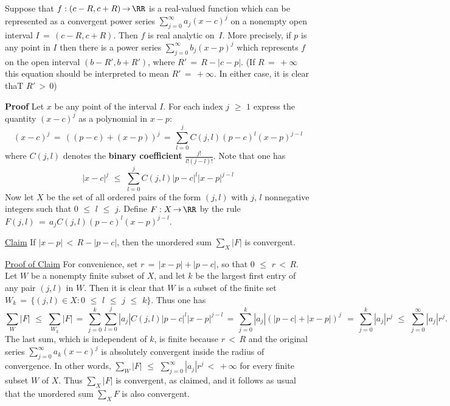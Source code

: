         Suppose that $f:(c-R,c+R) \,{\rightarrow}\, {\RR}$ is a real-valued function which can be represented as a convergent power series
    $\sum_{j=0}^{{\infty}} a_{j}(x-c)^{j}$ on a nonempty open interval $I \,=\, (c-R,c+R)$.
    Then $f$ is real analytic on~$I$. More precisely, if $p$ is any point in $I$ then there is a power series $\sum_{j=0}^{{\infty}} b_{j}(x-p)^{j}$
    which represents $f$ on the open interval $(b-R',b+R')$, where $R' \,=\, R-|c-p|$.
    (If $R \,=\, +{\infty}$ this equation should be interpreted to mean $R' \,=\, +{\infty}$.
    In either case, it is clear thaT $R'\,>\,0$)

\V

        {\bf Proof} Let $x$ be any point of the interval $I$. For each index $j\,\,{\geq}\,\,1$ express the quantity $(x-c)^{j}$ as a polynomial in $x-p$:
        \begin{displaymath}
        (x-c)^{j} \,=\, ((p-c) + (x-p))^{j} \,=\, \sum_{l=0}^{j}
 C(j,l)(p-c)^{l}(x-p)^{j-l}
        \end{displaymath}
 where $C(j,l)$ denotes the {\bf binary coefficient} ${\displaystyle \frac{j!}{l!(j-l)!}}$.
    Note that one has
        \begin{displaymath}
        |x-c|^{j}\,\,{\leq}\,\,\sum_{l=0}^{j}
 C(j,l)|p-c|^{l}|x-p|^{j-l}
        \end{displaymath}
    Now let $X$ be the set of all ordered pairs of the form $(j,l)$ with $j$, $l$ nonnegative integers such that $0\,\,{\leq}\,\,l\,\,{\leq}\,\,j$.
    Define $F:X \,{\rightarrow}\, {\RR}$ by the rule $F(j,l) \,=\, a_{j}C(j,l)(p-c)^{l}(x-p)^{j-l}$.

        \underline{Claim} If $|x-p|\,<\,R-|p-c|$, then the unordered sum $\sum_{X} |F|$ is convergent.

        \underline{Proof of Claim} For convenience, set $r \,=\, |x-p| + |p-c|$, so that $0\,\,{\leq}\,\,r\,<\,R$.
    Let $W$ be a nonempty finite subset of $X$, and let $k$ be the largest first entry of any pair $(j,l)$ in $W$.
    Then it is clear that $W$ is a subset of the finite set $W_{k} \,=\, \{(j,l){\in}X: 0\,\,{\leq}\,\,l\,\,{\leq}\,\,j\,\,{\leq}\,\,k\}$.
    Thus one has
        \begin{displaymath}
        \sum_{W} |F|\,\,{\leq}\,\,\sum_{W_{k}} |F| \,=\, \sum_{j=0}^{k} \sum_{l=0}^{j} |a_{j}|C(j,l)|p-c|^{l}|x-p|^{j-l} \,=\,  
    \sum_{j=0}^{k} |a_{j}|\left(|p-c| + |x-p|\right)^{j}\ \,=\, \sum_{j=0}^{k} |a_{j}|r^{j}\,\,{\leq}\,\,\sum_{j=0}^{{\infty}} |a_{j}|r^{j}.
        \end{displaymath}
    The last sum, which is independent of $k$, is finite because $r\,<\,R$ and the original series $\sum_{j=0}^{{\infty}} a_{k}(x-c)^{j}$
    is absolutely convergent inside the radius of convergence.
    In other words, $\sum_{W} |F|\,\,{\leq}\,\,\sum_{j=0}^{{\infty}} |a_{j}|r^{j}\,<\,+{\infty}$ for every finite subset $W$ of $X$.
    Thus $\sum_{X} |F|$ is convergent, as claimed, and it follows as usual that the unordered sum $\sum_{X} F$ is also convergent.

